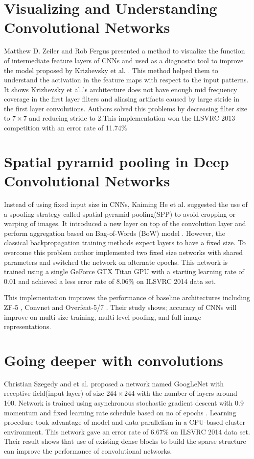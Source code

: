 \documentclass{article}
\begin{document}
\section{Visualizing and Understanding Convolutional Networks}

Matthew D. Zeiler and Rob Fergus\cite{Zeiler2013} presented a method to visualize the function of intermediate feature layers of CNNs and used as a diagnostic tool to improve  the model proposed by Krizhevsky et al. \cite{Krizhevsky2012a}. This method helped  them  to understand  the activation in the feature maps with respect to the input patterns. It shows Krizhevsky et al..'s architecture does not have  enough mid frequency coverage in the first layer filters and aliasing artifacts caused by  large stride in the first layer convolutions. Authors solved this problems by decreasing filter size to $7\times7$ and reducing stride to 2.This implementation won the  ILSVRC 2013 competition with an error rate of 11.74\%



\section{Spatial pyramid pooling in Deep Convolutional Networks}
Instead of using fixed input size in CNNs, Kaiming He et al. \cite{He2014} suggested  the use of a spooling strategy called  spatial pyramid pooling(SPP)\cite{Grauman2005}\cite{1641019} to avoid cropping or warping of  images. It introduced a new layer on top of the convolution layer and perform aggregation  based on Bag-of-Words (BoW) model \cite{Sivic2003}. However, the classical backpropagation training methods expect layers to have a fixed   size. To overcome this problem author implemented two fixed size networks with shared parameters and switched the network on alternate epochs. This network is trained using a single GeForce GTX Titan GPU with a starting  learning rate of 0.01 and achieved  a less  error rate of 8.06\% on  ILSVRC 2014 data set. 
\par 
This implementation improves the performance of baseline architectures including ZF-5\cite{Zeiler2013} , Convnet \cite{Krizhevsky2012a} and Overfeat-5/7 \cite{Sermanet2013}. Their study shows; accuracy of CNNs will improve on multi-size training, multi-level pooling, and full-image representations. 
%




\section{Going deeper with convolutions }
Christian Szegedy and et al. \cite{Szegedy} proposed a network named GoogLeNet with receptive field(input layer) of size $244\times244$ with the number of layers around 100. Network is trained using asynchronous stochastic gradient descent with 0.9 momentum and fixed learning rate schedule based on  no of epochs 
. Learning procedure took advantage of  model and data-parallelism in a CPU-based cluster environment. This network gave an error rate of  6.67\%  on  ILSVRC 2014 data set. Their result shows that use of existing dense  blocks to  build the sparse structure can improve the  performance of convolutional networks.
\end{document}
